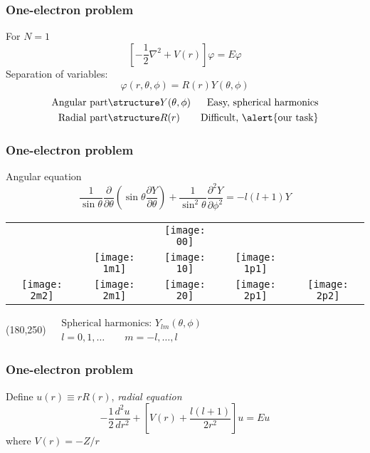 \begin{frame}[t]
  \frametitle{One-electron problem}
  For $N=1$
  \[ \left[ -\frac{1}{2} \nabla^2 + V(r) \right] \varphi = E \varphi \]
  Separation of variables:
  \[ \varphi(r,\theta,\phi) = R(r)Y(\theta,\phi) \]
  \begin{eqnarray*}
    \text{Angular part} & \emph{Y(\theta,\phi)} & \text{Easy, spherical harmonics} \\
    \text{Radial part} & \emph{R(r)} & \text{Difficult, \alert{our task}}
  \end{eqnarray*}
\end{frame}

\begin{frame}[t]
  \frametitle{One-electron problem}
  \footnotesize
  Angular equation
  \[\frac{1}{\sin{\theta}} \frac{\partial}{\partial \theta} \left( \sin{\theta} \frac{\partial Y}{\partial \theta} \right) + \frac{1}{\sin^2{\theta}} \frac{\partial^2 Y}{\partial \phi^2} = -l(l+1) Y\]
  
  \vspace{-1.6em}
  \pause
  \begin{center}
  \begin{tabular}{c c c c c}
  & & \texttt{[image: 00]} & & \\
  & \texttt{[image: 1m1]} & \texttt{[image: 10]} & \texttt{[image: 1p1]} & \\
  \texttt{[image: 2m2]} & \texttt{[image: 2m1]} & \texttt{[image: 20]} & \texttt{[image: 2p1]} & \texttt{[image: 2p2]}
  \end{tabular}
  \end{center}
  
  \Put(180,250){\emph{
  $\boxed{\begin{aligned}
  & \text{Spherical harmonics: } Y_{lm}(\theta,\phi) \\
  & l = 0,1,\ldots \qquad m = -l,\ldots,l
  \end{aligned}}$}}
\end{frame}

\begin{frame}[t]
  \frametitle{One-electron problem}
  \footnotesize
  Define $u(r) \equiv rR(r)$, \emph{radial equation}
  \[\boxed{-\frac{1}{2} \frac{d^2u}{dr^2} + \left[ V(r) + \frac{l(l+1)}{2r^2} \right] u = E u}\]
  where $V(r)=-Z/r$
  \pause
  \setcounter{subfigure}{0}
  \begin{figure}[h!]
  \centering
  \subfloat[][$Z=1$]{\texttt{[image: Z1]}}
  \subfloat[][$Z=2$]{\texttt{[image: Z2]}}
  \subfloat[][$Z=3$]{\texttt{[image: Z3]}}
  \end{figure}
\end{frame}


